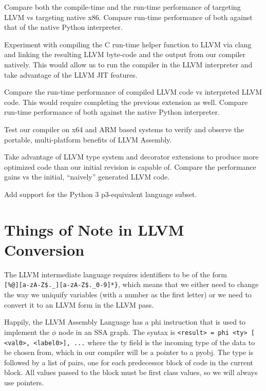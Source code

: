\documentclass[11pt]{article}
\newenvironment{packed_enum}{
\begin{enumerate}
  \setlength{\itemsep}{1pt}
  \setlength{\parskip}{0pt}
  \setlength{\parsep}{0pt}
}{\end{enumerate}}
\newenvironment{packed_item}{
\begin{itemize}
  \setlength{\itemsep}{1pt}
  \setlength{\parskip}{0pt}
  \setlength{\parsep}{0pt}
}{\end{itemize}}
\begin{document}
\begin{packed_item}
\item Compare both the compile-time and the run-time performance of
  targeting LLVM vs targeting native x86. Compare run-time performance
  of both against that of the native Python interpreter.
\item Experiment with compiling the C run-time helper function to LLVM
  via clang\cite{clang.llvm.org}
  and linking the resulting LLVM byte-code and the output
  from our compiler natively. This would allow us to run the compiler
  in the LLVM interpreter and take advantage of the LLVM JIT features.
\item Compare the run-time performance of compiled LLVM code vs
  interpreted LLVM code. This would require completing the previous
  extension as well. Compare run-time performance
  of both against the native Python interpreter.
\item Test our compiler on x64 and ARM based systems to verify and
  observe the portable, multi-platform benefits of LLVM Assembly.
\item Take advantage of LLVM type system and decorator extensions to
  produce more optimized code than our initial revision is capable of.
  Compare the performance gains vs the initial, ``naively'' generated
  LLVM code.
\item Add support for the Python 3 p3-equivalent language subset.
\end{packed_item}

\section{Things of Note in LLVM Conversion}
\begin{packed_enum}
\item The LLVM intermediate language requires identifiers to be of the form\\
\verb+[%@][a-zA-Z$._][a-zA-Z$._0-9]*}+, which means that we either need to
change the way we uniquify variables (with a number as the first letter) or
we need to convert it to an LLVM form in the LLVM pass.
\item Happily, the LLVM Assembly Language has a phi instruction that is used to implement the $\phi$ node in an SSA graph. The syntax is
\verb+<result> = phi <ty> [ <val0>, <label0>], ...+ where the ty field is the incoming type of the data to be chosen from, which in our compiler will be a pointer to a pyobj. The type is followed by a list of pairs, one for each predecessor block of code in the current block. All values passed to the block must be first class values, so we will always use pointers.
\end{packed_enum}
\end{document}
